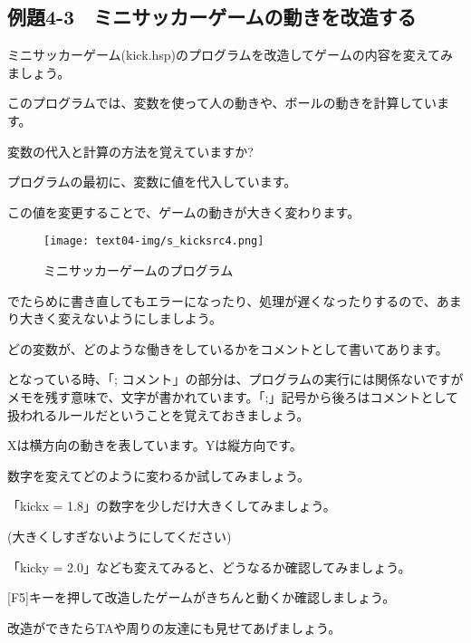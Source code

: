 \newpage
\subsection{例題4-3　ミニサッカーゲームの動きを改造する}

\begin{description}
    \item {}
\end{description}

ミニサッカーゲーム(kick.hsp)のプログラムを改造してゲームの内容を変えてみましょう。

このプログラムでは、変数を使って人の動きや、ボールの動きを計算しています。

変数の代入と計算の方法を覚えていますか?



プログラムの最初に、変数に値を代入しています。

この値を変更することで、ゲームの動きが大きく変わります。


\begin{figure}[H]
    \begin{center}
      \texttt{[image: text04-img/s\_kicksrc4.png]}
      \caption{ミニサッカーゲームのプログラム}
    \end{center}
    \label{fig:prog_menu}
\end{figure}


でたらめに書き直してもエラーになったり、処理が遅くなったりするので、あまり大きく変えないようにしましよう。

どの変数が、どのような働きをしているかをコメントとして書いてあります。


\begin{description}
    \item {}
\end{description}

となっている時、「; コメント」の部分は、プログラムの実行には関係ないですがメモを残す意味で、文字が書かれています。「;」記号から後ろはコメントとして扱われるルールだということを覚えておきましょう。

Xは横方向の動きを表しています。Yは縦方向です。

数字を変えてどのように変わるか試してみましょう。


\begin{description}
    \item {}
\end{description}



「kickx = 1.8」の数字を少しだけ大きくしてみましょう。

(大きくしすぎないようにしてください)

「kicky = 2.0」なども変えてみると、どうなるか確認してみましょう。



[F5]キーを押して改造したゲームがきちんと動くか確認しましょう。

改造ができたらTAや周りの友達にも見せてあげましょう。









